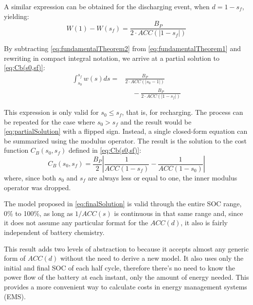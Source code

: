 \documentclass{ieeeaccess}
\begin{document}
    A similar expression can be obtained for the discharging event, when $d=1-s_{f}$, yielding:
    \begin{equation}
        W(1) - W(s_{f}) = \frac{B_{P}}{2 \cdot ACC(|1-s_{f}|)}
        \label{eq:fundamentalTheorem2}
    \end{equation}

    By subtracting \eqref{eq:fundamentalTheorem2} from \eqref{eq:fundamentalTheorem1} and rewriting in compact integral notation, we arrive at a partial solution to \eqref{eq:Cb(s0,sf)}:
    \begin{equation}
        \begin{aligned}
            \int_{s_{0}}^{s_{f}}w(s)ds = & \frac{B_{P}}{2 \cdot ACC(|s_{0}-1|)}            \\
            & \;\;\;\; - \frac{B_{P}}{2 \cdot ACC(|1-s_{f}|)}
        \end{aligned}
        \label{eq:partialSolution}
    \end{equation}

    This expression is only valid for $s_{0} \le s_{f}$, that is, for recharging. The process can be repeated for the case where $s_{0} > s_{f}$ and the result would be \eqref{eq:partialSolution} with a flipped sign. Instead, a single closed-form equation can be summarized using the modulus operator. The result is the solution to the cost function $C_{B}(s_{0}, s_{f})$ defined in \eqref{eq:Cb(s0,sf)}:
    \begin{equation}
        C_{B}(s_{0}, s_{f}) = \frac{B_{P}}{2} \left| \frac{1}{ACC(1-s_{f})} - \frac{1}{ACC(1-s_{0})} \right|
        \label{eq:finalSolution}
    \end{equation}
    where, since both $s_{0}$ and $s_{f}$ are always less or equal to one, the inner modulus operator was dropped.

    The model proposed in \eqref{eq:finalSolution} is valid through the entire SOC range, 0\% to 100\%, as long as $1/ACC(s)$ is continuous in that same range and, since it does not assume any particular format for the $ACC(d)$, it also is fairly independent of battery chemistry.

    This result adds two levels of abstraction to \cite{HAN2014} because it accepts almost any generic form of $ACC(d)$ without the need to derive a new model. It also uses only the initial and final SOC of each half cycle, therefore there's no need to know the power flow of the battery at each instant, only the amount of energy needed. This provides a more convenient way to calculate costs in energy management systems (EMS).
\end{document}
